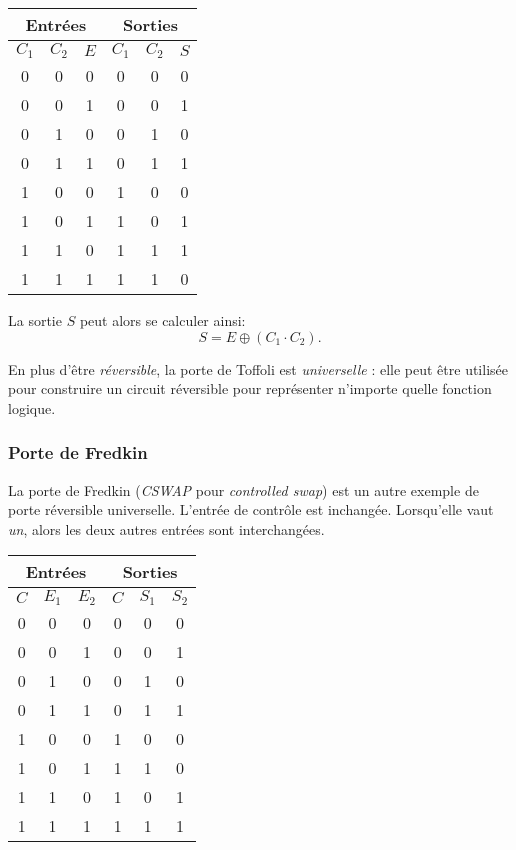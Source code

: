 \documentclass[canadien,12pt,oneside,letterpaper]{article}
\begin{document}
\begin{center}
\begin{tabular}{|c|c|c|c|c|c|}
\hline
\multicolumn{3}{|c|}{Entrées} & \multicolumn{3}{|c|}{Sorties} \\
\hline
$C_1$ & $C_2$ & $E$ & $C_1$ & $C_2$ & $S$ \\
\hline
0 & 0 & 0 & 0 & 0 & 0 \\
\hline
0 & 0 & 1 & 0 & 0 & 1 \\
\hline
0 & 1 & 0 & 0 & 1 & 0\\
\hline
0 & 1 & 1 & 0 & 1 & 1 \\
\hline
1 & 0 & 0 & 1 & 0 & 0 \\
\hline
1 & 0 & 1 & 1 & 0 & 1 \\
\hline
1 & 1 & 0 & 1 & 1 & 1 \\
\hline
1 & 1 & 1 & 1 & 1 & 0 \\
\hline
\end{tabular}
\end{center}

La sortie $S$ peut alors se calculer ainsi:
\begin{equation}
S=E\oplus \left(C_1\cdot C_2\right).
\end{equation}

En plus d'être \textit{réversible}, la porte de Toffoli est \textit{universelle} : elle peut être utilisée pour construire un circuit réversible pour représenter n'importe quelle fonction logique.


\subsubsection{Porte de Fredkin}

La porte de Fredkin (\textit{CSWAP} pour \textit{controlled swap}) est un autre exemple de porte réversible universelle. L'entrée de contrôle est inchangée. Lorsqu'elle vaut \textit{un}, alors les deux autres entrées sont interchangées.

\begin{center}
\begin{tabular}{|c|c|c|c|c|c|}
\hline
\multicolumn{3}{|c|}{Entrées} & \multicolumn{3}{|c|}{Sorties} \\
\hline
$C$ & $E_1$ & $E_2$ & $C$ & $S_1$ & $S_2$ \\
\hline
0 & 0 & 0 & 0 & 0 & 0 \\
\hline
0 & 0 & 1 & 0 & 0 & 1 \\
\hline
0 & 1 & 0 & 0 & 1 & 0\\
\hline
0 & 1 & 1 & 0 & 1 & 1 \\
\hline
1 & 0 & 0 & 1 & 0 & 0 \\
\hline
1 & 0 & 1 & 1 & 1 & 0 \\
\hline
1 & 1 & 0 & 1 & 0 & 1 \\
\hline
1 & 1 & 1 & 1 & 1 & 1 \\
\hline
\end{tabular}
\end{center}
\end{document}
